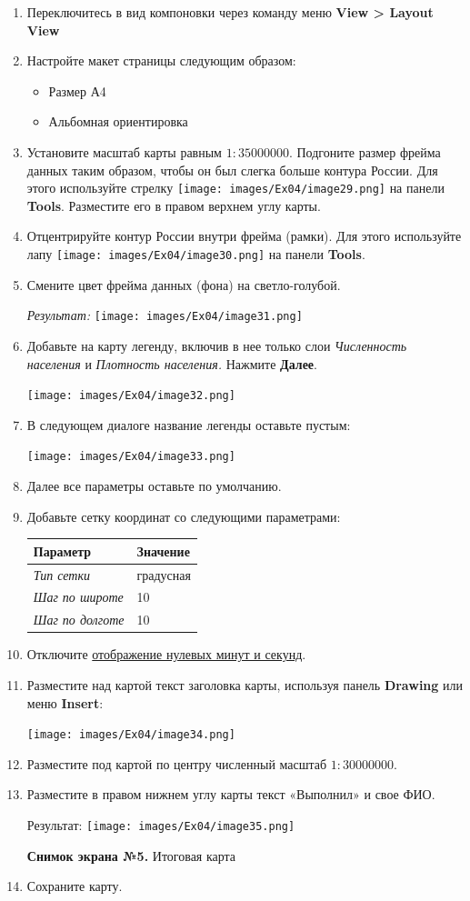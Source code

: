 \documentclass[12pt,]{book}
\providecommand{\tightlist}{%
  \setlength{\itemsep}{0pt}\setlength{\parskip}{0pt}}
\begin{document}
\begin{enumerate}
\def\labelenumi{\arabic{enumi}.}
\item
  Переключитесь в вид компоновки через команду меню \textbf{View \textgreater{} Layout View}
\item
  Настройте макет страницы следующим образом:

  \begin{itemize}
  \tightlist
  \item
    Размер А4
  \item
    Альбомная ориентировка
  \end{itemize}
\item
  Установите масштаб карты равным \(1:35 000 000\). Подгоните размер фрейма данных таким образом, чтобы он был слегка больше контура России. Для этого используйте стрелку \texttt{[image: images/Ex04/image29.png]} на панели \textbf{Tools}. Разместите его в правом верхнем углу карты.
\item
  Отцентрируйте контур России внутри фрейма (рамки). Для этого используйте лапу \texttt{[image: images/Ex04/image30.png]} на панели \textbf{Tools}.
\item
  Смените цвет фрейма данных (фона) на светло-голубой.

  \emph{Результат:}
  \texttt{[image: images/Ex04/image31.png]}
\item
  Добавьте на карту легенду, включив в нее только слои \emph{Численность населения} и \emph{Плотность населения.} Нажмите \textbf{Далее}.

  \texttt{[image: images/Ex04/image32.png]}
\item
  В следующем диалоге название легенды оставьте пустым:

  \texttt{[image: images/Ex04/image33.png]}
\item
  Далее все параметры оставьте по умолчанию.
\item
  Добавьте сетку координат со следующими параметрами:

  \begin{longtable}[]{@{}ll@{}}
  \toprule
  \textbf{Параметр} & \textbf{Значение}\tabularnewline
  \midrule
  \endhead
  \emph{Тип сетки} & градусная\tabularnewline
  \emph{Шаг по широте} & 10\tabularnewline
  \emph{Шаг по долготе} & 10\tabularnewline
  \bottomrule
  \end{longtable}
\item
  Отключите \protect\hyperlink{manual-projections-zero-degrees}{отображение нулевых минут и секунд}.
\item
  Разместите над картой текст заголовка карты, используя панель \textbf{Drawing} или меню \textbf{Insert}:

  \texttt{[image: images/Ex04/image34.png]}
\item
  Разместите под картой по центру численный масштаб \(1:30 000 000\).
\item
  Разместите в правом нижнем углу карты текст «Выполнил» и свое ФИО.

  Результат:
  \texttt{[image: images/Ex04/image35.png]}

  \textbf{Снимок экрана №5.} Итоговая карта
\item
  Сохраните карту.
\end{enumerate}
\end{document}

